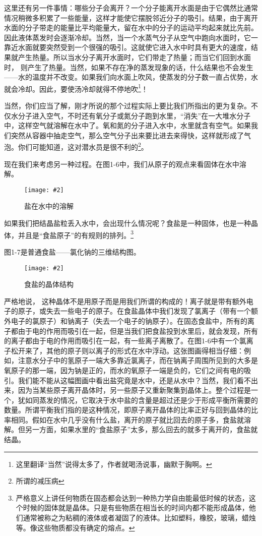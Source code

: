 \documentclass[12pt,oneside]{book}
\newenvironment{fig}[2][1]
{\begin{figure}[H]
\centering
\texttt{[image: \#2]}}
{\end{figure}}
\begin{document}
这里还有另一件事情：哪些分子会离开？一个分子能离开水面是由于它偶然比通常情况稍微多积累了一些能量，这样才能使它摆脱邻近分子的吸引。结果，由于离开水面的分子带走的能量比平均能量大，留在水中的分子的运动平均起来就比先前。因此液体蒸发时会逐渐冷却。当然，当一个水蒸气分子从空气中跑向水面时，它一靠近水面就要突然受到一个很强的吸引。这就使它进入水中时具有更大的速度，结果就产生热量。所以当水分子离开水面时，它们带走了热量；而当它们回到水面时， 则产生了热量。当然，如果不存在净的蒸发现象的话，什么结果也不会发生——水的温度并不改变。如果我们向水面上吹风，使蒸发的分子数一直占优势，水就会冷却。因此，要使汤冷却就得不停地吹\footnote{这里翻译“当然”说得太多了，作者就喝汤说事，幽默于胸啊。}！

当然，你们应当了解，刚才所说的那个过程实际上要比我们所指出的更为复杂。不仅水分子进入空气，不时还有氧分子或氮分子跑到水里，“消失”在一大堆水分子中，这样空气就溶解在水中了。氧和氮的分子进入水中，水里就含有空气。如果我们突然从容器中抽走空气，那么空气分子出来要比进去来得快，这样就形成了气泡。你们可能知道，这对潜水员是很不利的\footnote{所谓的减压病}。

现在我们来考虑另一种过程。在图1-6中，我们从原子的观点来看固体在水中溶解。
\begin{fig}{盐在水中的溶解}
\caption{盐在水中的溶解}
\label{fig:盐在水中的溶解}
\end{fig}
如果我们把结晶盐粒丢入水中，会出现什么情况呢？食盐是一种固体，也是一种晶体，并且是“食盐原子”的有规则的排列。\footnote{严格意义上讲任何物质在固态都会达到一种热力学自由能最低时候的状态，这个时候的固体就是晶体。只是有些物质在相当长的时间内都不能形成晶体，他们通常被称之为粘稠的液体或者凝固了的液体。比如塑料，橡胶，玻璃，蜡烛等。像这些物质都没有确定的熔点。}

图1-7是普通食盐——氯化钠的三维结构图。
\begin{fig}{食盐的晶体结构}
\caption{食盐的晶体结构}
\label{fig:食盐的晶体结构}
\end{fig}
严格地说， 这种晶体不是用原子而是用我们所谓的构成的！离子就是带有额外电子的原子，或失去一些电子的原子。在食盐晶体中我们发现了氯离子（带有一个额外电子的氯原子）和钠离子（失去一个电子的钠原子）。在固态食盐中，所有的离子都由于电的作用而吸引在一起，但是当我们把食盐投到水里后，就会发现，所有的离子都由于电的作用而吸引在一起，有一些离子离散了。在图1-6中有一个氯离子松开来了，其他的原子则以离子的形式在水中浮动。这张图画得相当仔细：例如，注意水分子中的氢原子一端大多靠近氯离子，而在钠离子周围所见到的大多是氧原子的那一端，因为钠是正的，而水的氧原子一端是负的，它们之间有电的吸引。我们能不能从这幅图画中看出盐究竟是水中，还是从水中？当然，我们看不出来，因为当某些原子离开晶体时，另一些原子又重新聚集到晶体上。整个过程是一个，犹如同蒸发的情况，它取决于水中盐的含量是超过还是少于形成平衡所需要的数量。所谓平衡我们指的是这种情况，即原子离开晶体的比率正好与回到晶体的比率相同。假如在水中几乎没有什么盐，离开的原子就比回去的原子多，食盐就溶解。但另一方面，如果水里的“食盐原子”太多，那么回去的就多于离开的，食盐就结晶。
\end{document}
